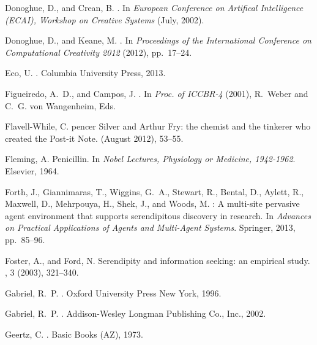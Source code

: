 \documentclass{llncs}
\begin{document}
\begin{thebibliography}{10}
{\sc Donoghue, D., and Crean, B.}
.
\newblock In {\em European Conference on Artifical Intelligence (ECAI),
  Workshop on Creative Systems\/} (July, 2002).

{\sc Donoghue, D., and Keane, M.}
.
\newblock In {\em Proceedings of the International Conference on Computational
  Creativity 2012\/} (2012), pp.~17--24.

{\sc Eco, U.}
.
\newblock Columbia University Press, 2013.

{\sc Figueiredo, A.~D., and Campos, J.}
.
\newblock In {\em Proc. of ICCBR-4\/} (2001), R.~Weber and C.~G. von
  Wangenheim, Eds.

{\sc Flavell-While, C.}
pencer {S}ilver and {A}rthur {F}ry: the chemist and the tinkerer
  who created the {P}ost-it {N}ote.
 (August 2012), 53--55.

{\sc Fleming, A.}
\newblock Penicillin.
\newblock In {\em Nobel Lectures, Physiology or Medicine, 1942-1962}. Elsevier,
  1964.

{\sc Forth, J., Giannimaras, T., Wiggins, G.~A., Stewart, R., Bental, D.,
  Aylett, R., Maxwell, D., Mehrpouya, H., Shek, J., and Woods, M.}
: A multi-site pervasive agent environment that supports
  serendipitous discovery in research.
\newblock In {\em Advances on Practical Applications of Agents and Multi-Agent
  Systems}. Springer, 2013, pp.~85--96.

{\sc Foster, A., and Ford, N.}
\newblock Serendipity and information seeking: an empirical study.
, 3 (2003), 321--340.

{\sc Gabriel, R.~P.}
.
\newblock Oxford University Press New York, 1996.

{\sc Gabriel, R.~P.}
.
\newblock Addison-Wesley Longman Publishing Co., Inc., 2002.

{\sc Geertz, C.}
.
\newblock Basic Books (AZ), 1973.


\end{thebibliography}
\end{document}
